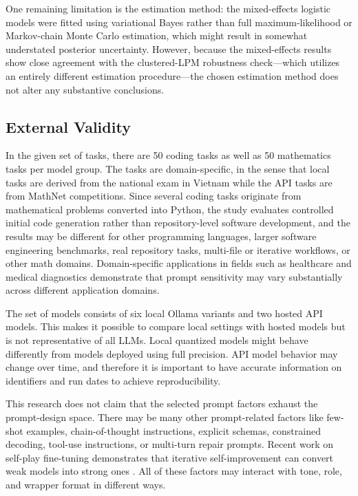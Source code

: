 One remaining limitation is the estimation method: the mixed-effects logistic models were fitted using variational Bayes rather than full maximum-likelihood or Markov-chain Monte Carlo estimation, which might result in somewhat understated posterior uncertainty. However, because the mixed-effects results show close agreement with the clustered-LPM robustness check—which utilizes an entirely different estimation procedure—the chosen estimation method does not alter any substantive conclusions.

\subsection{External Validity}

In the given set of tasks, there are 50 coding tasks as well as 50 mathematics tasks per model group. The tasks are domain-specific, in the sense that local tasks are derived from the national exam in Vietnam while the API tasks are from MathNet competitions. Since several coding tasks originate from mathematical problems converted into Python, the study evaluates controlled initial code generation rather than repository-level software development, and the results may be different for other programming languages, larger software engineering benchmarks, real repository tasks, multi-file or iterative workflows, or other math domains. Domain-specific applications in fields such as healthcare \cite{singhal2025medical, amugongo2025rag} and medical diagnostics \cite{chow2025medicalchatbots, ansari2025ecg} demonstrate that prompt sensitivity may vary substantially across different application domains.

The set of models consists of six local Ollama variants and two hosted API models. This makes it possible to compare local settings with hosted models but is not representative of all LLMs. Local quantized models might behave differently from models deployed using full precision. API model behavior may change over time, and therefore it is important to have accurate information on identifiers and run dates to achieve reproducibility.

This research does not claim that the selected prompt factors exhaust the prompt-design space. There may be many other prompt-related factors like few-shot examples, chain-of-thought instructions, explicit schemas, constrained decoding, tool-use instructions, or multi-turn repair prompts. Recent work on self-play fine-tuning demonstrates that iterative self-improvement can convert weak models into strong ones \cite{chen2024self}. All of these factors may interact with tone, role, and wrapper format in different ways.

